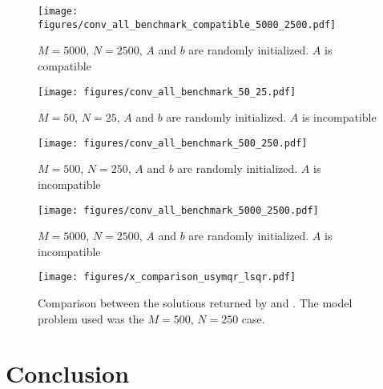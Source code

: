 \documentclass[10pt,letterpaper]{article}
\newcommand{\alg}[1]{\textproc{#1}}
\begin{document}
\begin{figure}[H]
    \centering
    \texttt{[image: figures/conv\_all\_benchmark\_compatible\_5000\_2500.pdf]}
    \caption{$M=5000$, $N=2500$, $A$ and $b$ are randomly initialized.
             $A$ is compatible}
    \label{fig:compat_5000_2500}
\end{figure}

\begin{figure}[H]
    \centering
    \texttt{[image: figures/conv\_all\_benchmark\_50\_25.pdf]}
    \caption{$M=50$, $N=25$, $A$ and $b$ are randomly initialized.
             $A$ is incompatible}
    \label{fig:incompat_50_25}
\end{figure}

\begin{figure}[H]
    \centering
    \texttt{[image: figures/conv\_all\_benchmark\_500\_250.pdf]}
    \caption{$M=500$, $N=250$, $A$ and $b$ are randomly initialized.
             $A$ is incompatible}
    \label{fig:incompat_500_250}
\end{figure}

\begin{figure}[H]
    \centering
    \texttt{[image: figures/conv\_all\_benchmark\_5000\_2500.pdf]}
    \caption{$M=5000$, $N=2500$, $A$ and $b$ are randomly initialized.
             $A$ is incompatible}
    \label{fig:incompat_5000_2500}
\end{figure}

\begin{figure}[H]
    \centering
    \texttt{[image: figures/x\_comparison\_usymqr\_lsqr.pdf]}
    \caption{Comparison between the solutions returned by \alg{USYMQR} and 
             \alg{LSQR}. The model problem used was the $M=500$, $N=250$ 
             case.}
    \label{fig:x_lsqr_usymqr}
\end{figure}






\section{Conclusion} 

\newpage


\end{document}
